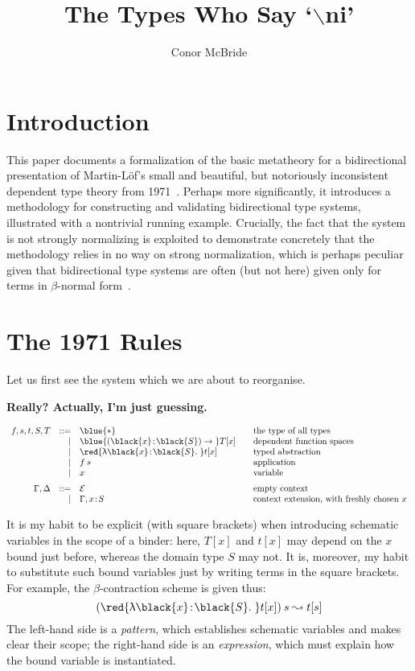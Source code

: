 \documentclass[natbib]{article}
\newcommand{\type}{\blue{\ast}}
\newcommand{\hb}{\!:\!}
\newcommand{\PI}[2]{\blue{(\black{#1}\hb \black{#2})\to\;}}
\newcommand{\LT}[2]{\red{\uplambda\black{#1}\hb \black{#2}.\;}}
\newcommand{\EC}{\mathcal{E}}
\begin{document}
\title{The Types Who Say `$\backslash$ni'}
\author{Conor McBride}
\maketitle

\section{Introduction}

This paper documents a formalization of the basic metatheory for a
bidirectional presentation of Martin-L\"of's small and beautiful, but
notoriously inconsistent dependent type theory from
1971~\cite{martinloef:atheoryoftypes}. Perhaps more significantly, it
introduces a methodology for constructing and validating bidirectional
type systems, illustrated with a nontrivial running
example. Crucially, the fact that the system is not strongly
normalizing is exploited to demonstrate concretely that the
methodology relies in no way on strong normalization, which is perhaps
peculiar given that bidirectional type systems are often (but not
here) given only for terms in $\beta$-normal
form~\cite{DBLP:journals/toplas/PierceT00}.


\section{The 1971 Rules}

Let us first see the system which we are about to reorganise.

\textbf{Really? Actually, I'm just guessing.}

\[\begin{array}{rrl@{\qquad}l}
f,s,t,S,T & ::= & \type & \mbox{the type of all types} \\
          &   | & \PI xS T[x] & \mbox{dependent function spaces} \\
          &   | & \LT xS t[x] & \mbox{typed abstraction} \\
          &   | & f\:s        & \mbox{application} \\
          &   | & x           & \mbox{variable} \medskip\\
\Gamma,\Delta & ::= & \EC & \mbox{empty context} \\
              &   | & \Gamma,x\hb S & \mbox{context extension, with freshly chosen $x$}
\end{array}\]

It is my habit to be explicit (with square brackets) when introducing schematic variables in the scope of a binder: here, $T[x]$ and $t[x]$ may depend on the $x$ bound just before, whereas the domain type $S$ may not. It is, moreover, my habit to substitute such bound variables just by writing terms in the square brackets. For example, the $\beta$-contraction scheme is given thus:
\[
(\LT xS t[x])\:s \leadsto t[s]
\]
The left-hand side is a \emph{pattern}, which establishes schematic variables and makes clear their scope;
the right-hand side is an \emph{expression}, which must explain how the bound variable is instantiated.
\end{document}
